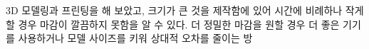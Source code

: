 \documentclass[a4paper, 10pt, nanum]{CSUniSchoolLabReport}
\begin{document}
	3D 모델링과 프린팅을 해 보았고, 크기가 큰 것을 제작함에 있어 시간에 비례하나 작게할 경우 마감이 깔끔하지 못함을 알 수 있다. 더 정밀한 마감을 원할 경우 더 좋은 기기를 사용하거나 모델 사이즈를 키워 상대적 오차를 줄이는 방



\end{document}
